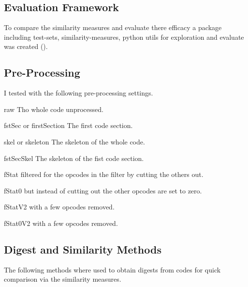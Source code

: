 \documentclass[../main.tex]{subfiles}
\begin{document}
\subsection{Evaluation Framework}
To compare the similarity measures and evaluate there efficacy a package including test-sets,
similarity-measures, python utils for exploration and evaluate was created ().

\subsection{Pre-Processing}
I tested with the following pre-processing settings.

\begin{desc}
  \item[raw] Tho whole code unprocessed.
  \item[fstSec or firstSection] The first code section.
  \item[skel or skeleton] The skeleton of the whole code.
  \item[fstSecSkel] The skeleton of the fist code section.
  \item[fStat]  filtered for the opcodes in the  filter by cutting the others out.
  \item[fStat0]  but instead of cutting out the other opcodes are set to zero.
  \item[fStatV2]  with a few opcodes removed.
  \item[fStat0V2]  with a few opcodes removed.
\end{desc}

\subsection{Digest and Similarity Methods}
The following methods where used to obtain digests from codes for quick comparison via the similarity measures.
\end{document}
